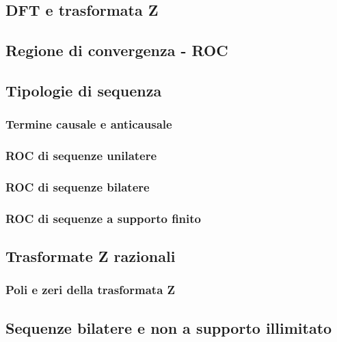 \documentclass[../main.tex]{subfiles}
\begin{document}


\subsection{DFT e trasformata Z}


\subsection{Regione di convergenza - ROC}

\subsection{Tipologie di sequenza}

\subsubsection{Termine causale e anticausale}
\subsubsection{ROC di sequenze unilatere}
\subsubsection{ROC di sequenze bilatere}
\subsubsection{ROC di sequenze a supporto finito}

\subsection{Trasformate Z razionali}
\subsubsection{Poli e zeri della trasformata Z}

\subsection{Sequenze bilatere e non a supporto illimitato}












	
\end{document}
